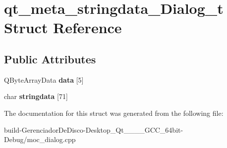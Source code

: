 \hypertarget{structqt__meta__stringdata__Dialog__t}{}\section{qt\+\_\+meta\+\_\+stringdata\+\_\+\+Dialog\+\_\+t Struct Reference}
\label{structqt__meta__stringdata__Dialog__t}
\subsection*{Public Attributes}
\begin{DoxyCompactItemize}
\item 
\hypertarget{structqt__meta__stringdata__Dialog__t_ae8df3bc8b623c73ab4d9b75541fe0ed8}{}Q\+Byte\+Array\+Data {\bfseries data} \mbox{[}5\mbox{]}\label{structqt__meta__stringdata__Dialog__t_ae8df3bc8b623c73ab4d9b75541fe0ed8}

\item 
\hypertarget{structqt__meta__stringdata__Dialog__t_aa3d88739476830b302bbe2887068499e}{}char {\bfseries stringdata} \mbox{[}71\mbox{]}\label{structqt__meta__stringdata__Dialog__t_aa3d88739476830b302bbe2887068499e}

\end{DoxyCompactItemize}


The documentation for this struct was generated from the following file\+:\begin{DoxyCompactItemize}
\item 
build-\/\+Gerenciador\+De\+Disco-\/\+Desktop\+\_\+\+Qt\+\_\+\_\+\_\+\_\+\+G\+C\+C\+\_\+64bit-\/\+Debug/moc\+\_\+dialog.\+cpp\end{DoxyCompactItemize}
